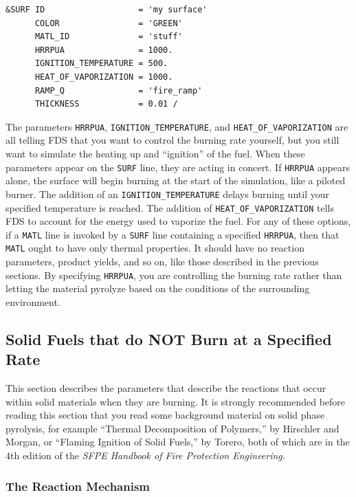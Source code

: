 \documentclass[11pt]{book}
\newcommand{\ct}{\tt\small}
\begin{document}
\footnotesize
\begin{verbatim}
&SURF ID                   = 'my surface'
      COLOR                = 'GREEN'
      MATL_ID              = 'stuff'
      HRRPUA               = 1000.
      IGNITION_TEMPERATURE = 500.
      HEAT_OF_VAPORIZATION = 1000.
      RAMP_Q               = 'fire_ramp'
      THICKNESS            = 0.01 /
\end{verbatim} \normalsize

\noindent
The parameters {\ct HRRPUA}, {\ct IGNITION\_TEMPERATURE}, and {\ct HEAT\_OF\_VAPORIZATION} are all telling FDS that you want to control the
burning rate yourself, but you still want to simulate the heating up and ``ignition'' of the fuel. When these parameters appear on the {\ct SURF} line, they
are acting in concert. If {\ct HRRPUA} appears alone, the surface will begin burning at the start of the simulation, like a piloted burner. The addition of
an {\ct IGNITION\_TEMPERATURE} delays burning until your specified temperature is reached. The addition of {\ct HEAT\_OF\_VAPORIZATION}
tells FDS to account for the energy used to vaporize the fuel. For any of these options, if a {\ct MATL} line is invoked by a {\ct SURF} line containing
a specified {\ct HRRPUA}, then that {\ct MATL} ought to have only thermal properties. It should have no reaction parameters, product yields, and so on, like
those described in the previous sections. By specifying {\ct HRRPUA}, you are controlling the burning rate rather than letting the material pyrolyze based on
the conditions of the surrounding environment.






\subsection{Solid Fuels that do NOT Burn at a Specified Rate}
\label{info:solid_pyrolysis}

This section describes the parameters that describe the reactions that occur within solid
materials when they are burning. It is strongly recommended before reading this section that you read some background material on
solid phase pyrolysis, for example ``Thermal Decomposition of Polymers,'' by Hirschler and Morgan, or
``Flaming Ignition of Solid Fuels,'' by Torero, both of which are in the 4th edition of the
{\em SFPE Handbook of Fire Protection Engineering}.

\subsubsection{The Reaction Mechanism}
\end{document}
